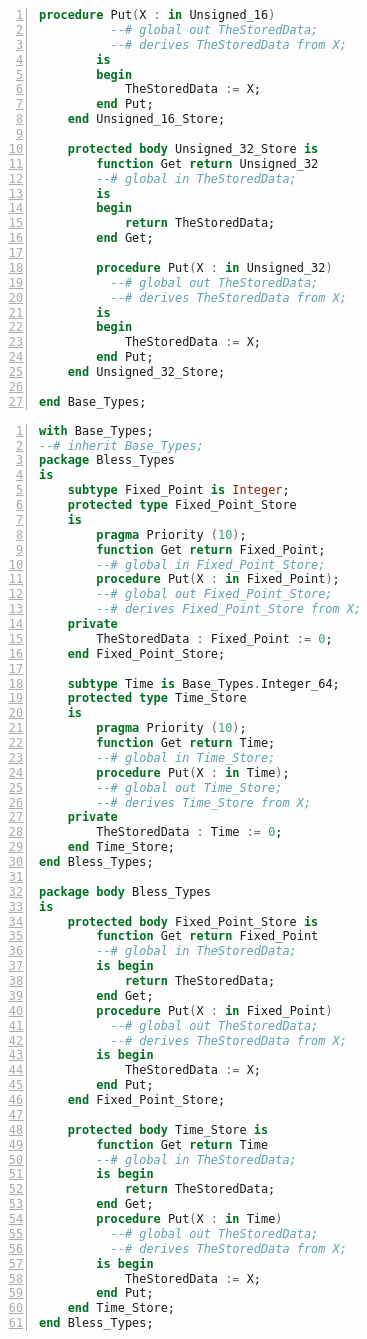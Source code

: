 \begin{lstlisting}[language=ada, gobble=0, numbers=left, caption={\lstinline{Base_Types} package}]
        procedure Put(X : in Unsigned_16)
          --# global out TheStoredData;
          --# derives TheStoredData from X;
        is
        begin
            TheStoredData := X;
        end Put;
    end Unsigned_16_Store;

    protected body Unsigned_32_Store is
        function Get return Unsigned_32
        --# global in TheStoredData;
        is
        begin
            return TheStoredData;
        end Get;

        procedure Put(X : in Unsigned_32)
          --# global out TheStoredData;
          --# derives TheStoredData from X;
        is
        begin
            TheStoredData := X;
        end Put;
    end Unsigned_32_Store;

end Base_Types;
\end{lstlisting} 
\label{listing:pca_generated:base_types}
\doublespacing

\newpage

\singlespacing
\begin{lstlisting}[language=ada, gobble=0, numbers=left, caption={\lstinline{Bless_Types} package}]
with Base_Types;
--# inherit Base_Types;
package Bless_Types
is
    subtype Fixed_Point is Integer;
    protected type Fixed_Point_Store 
    is
        pragma Priority (10);
        function Get return Fixed_Point;
        --# global in Fixed_Point_Store;
        procedure Put(X : in Fixed_Point);
        --# global out Fixed_Point_Store;
        --# derives Fixed_Point_Store from X;
    private
        TheStoredData : Fixed_Point := 0;
    end Fixed_Point_Store;

    subtype Time is Base_Types.Integer_64;
    protected type Time_Store 
    is
        pragma Priority (10);
        function Get return Time;
        --# global in Time_Store;
        procedure Put(X : in Time);
        --# global out Time_Store;
        --# derives Time_Store from X;
    private
        TheStoredData : Time := 0;
    end Time_Store;
end Bless_Types;

package body Bless_Types
is
    protected body Fixed_Point_Store is
        function Get return Fixed_Point
        --# global in TheStoredData;
        is begin
            return TheStoredData;
        end Get;
        procedure Put(X : in Fixed_Point)
          --# global out TheStoredData;
          --# derives TheStoredData from X;
        is begin
            TheStoredData := X;
        end Put;
    end Fixed_Point_Store;

    protected body Time_Store is
        function Get return Time
        --# global in TheStoredData;
        is begin
            return TheStoredData;
        end Get;
        procedure Put(X : in Time)
          --# global out TheStoredData;
          --# derives TheStoredData from X;
        is begin
            TheStoredData := X;
        end Put;
    end Time_Store;
end Bless_Types;
\end{lstlisting} 
\label{listing:pca_generated:bless_types}
\doublespacing


